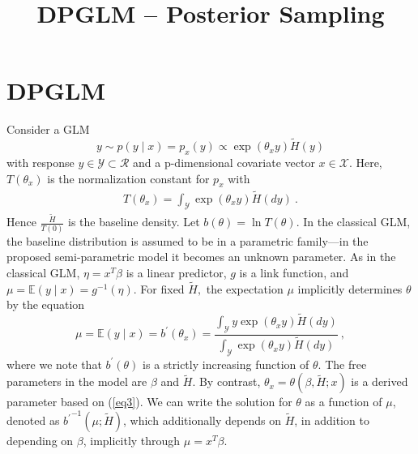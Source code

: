 \documentclass[10pt, oneside]{article}   	%
\title{DPGLM -- Posterior Sampling}
\date{}							%
\newcommand{\refa}[1]{\textcolor{blue}{\ref{#1}}}
\renewcommand{\th}{\theta}
\newcommand{\thh}{\widetilde{H}}
\newcommand{\E}{\mathbb{E}}
\begin{document}
\maketitle

\section{DPGLM}
Consider a GLM  
\begin{equation}
  y \sim p(y \mid x) = p_x(y) \propto \exp (\th_x y)\thh(y) \label{eq1} 
\end{equation}
with response $y \in \mathcal{Y} \subset \mathcal{R}$ and a p-dimensional covariate vector $x \in \mathcal{X}$. Here, $T(\th_x)$ is the normalization constant for $p_x$ with
\begin{eqnarray}
T(\th_x) = \int_{\mathcal{Y}} \exp (\th_x y) \thh(dy) \ . \label{eq2}  
 \end{eqnarray}
Hence $\frac{\thh}{T(0)}$ is the baseline density. Let $b(\theta) = \ln T(\theta)$. In the classical GLM, the baseline distribution is assumed to be in a parametric family---in the proposed semi-parametric model it becomes an unknown parameter.  As in the classical GLM, $\eta = x^T\beta$ is a linear predictor, $g$ is a link function, and $\mu = \E(y \mid x) = g^{-1}(\eta)$. For fixed $\thh,$ the expectation $\mu$ implicitly determines $\th$ by the equation
\begin{equation}
\mu = \E(y \mid x) = b^{\prime}(\th_x) = \frac{\int_{\mathcal{Y}} y \exp (\th_x y) \thh(dy)}{\int_{\mathcal{Y}} \exp (\th_x y) \thh(dy)} \ ,\label{eq3}
\end{equation}
where we note that $b^{\prime}(\theta)$  is a strictly increasing function of $\theta.$ The free parameters in the model are $\beta$ and $\thh$. By contrast, $\th_x = \theta (\beta, \thh; x)$ is a derived parameter based on (\refa{eq3}). We can write the solution for $\theta$ as a function of $\mu$, denoted as ${b^\prime}^{-1}(\mu; \thh)$, which additionally depends on $\thh$, in addition to depending on $\beta$, implicitly through $\mu = x^T\beta$.
\vspace{2mm}
\end{document}
